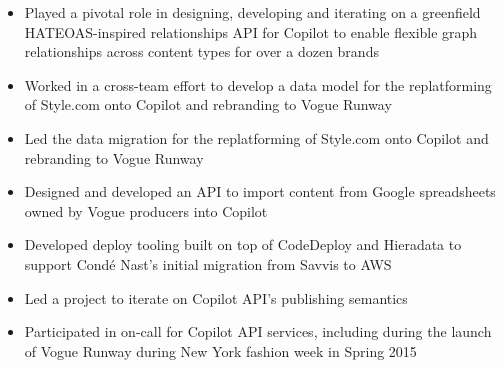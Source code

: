 \begin{itemize}
  \item Played a pivotal role in designing, developing and iterating on a
    greenfield HATEOAS-inspired relationships API for Copilot to enable flexible
    graph relationships across content types for over a dozen brands
  \item Worked in a cross-team effort to develop a data model for the
    replatforming of Style.com onto Copilot and rebranding to Vogue Runway
  \item Led the data migration for the replatforming of Style.com onto Copilot
  and rebranding to Vogue Runway
  \item Designed and developed an API to import content from Google spreadsheets
    owned by Vogue producers into Copilot
  \item Developed deploy tooling built on top of CodeDeploy and Hieradata to
    support Cond\'{e} Nast's initial migration from Savvis to AWS
  \item Led a project to iterate on Copilot API's publishing semantics
  \item Participated in on-call for Copilot API services, including during the
    launch of Vogue Runway during New York fashion week in Spring 2015
\end{itemize}
